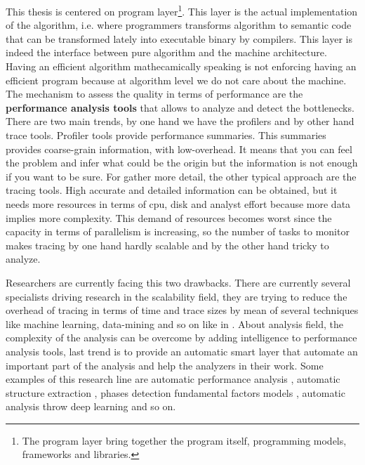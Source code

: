 \documentclass[12pt]{report}
\begin{document}
This thesis is centered on program layer\footnote{The program layer 
bring together the program itself, programming models, frameworks and libraries.}. 
This layer is the actual implementation of the algorithm, i.e. where programmers
transforms algorithm to  semantic code that can be transformed lately into
executable binary by compilers. This layer is indeed the interface between pure 
algorithm and the machine architecture. Having an efficient algorithm
mathecamically speaking is not enforcing having an efficient program 
because at algorithm level we do not care about the machine. 
The mechanism to assess the quality in terms of performance are the {\bf performance 
analysis tools} that allows to analyze and detect the bottlenecks. 
There are two main trends, by one hand we have the profilers and by other hand trace
tools. Profiler tools provide performance summaries. This summaries provides 
coarse-grain information, with low-overhead. It means that you can feel the problem 
and infer what could be the origin but the information is not enough if you want 
to be sure. For gather more detail, the other typical approach are the tracing 
tools. High accurate and detailed information can be obtained, but it needs 
more resources in terms of cpu, disk and analyst effort because more data implies 
more complexity. This demand of resources becomes worst since the capacity in 
terms of parallelism is increasing, so the number of tasks to monitor makes 
tracing by one hand hardly scalable and by the other hand tricky to analyze. 

Researchers are currently facing this two drawbacks. There are currently several
specialists driving research in the scalability field, they are trying to reduce 
the overhead of tracing in terms of time and trace sizes by mean of several 
techniques like machine learning, data-mining and so on like in 
\cite{llort2015intelligent}. About analysis field, the complexity of the analysis 
can be overcome by adding intelligence to performance analysis tools, last 
trend is to provide an automatic smart layer that automate an important part 
of the analysis and help the analyzers in their work. Some examples of this 
research line are automatic performance analysis \cite{wolf2003automatic}, 
automatic structure extraction \cite{casas2007automatic}, phases detection 
\cite{gonzalez2013application} fundamental factors models \cite{casas2008aass}, 
automatic analysis throw deep learning \cite{simon:2017:perfdp} and so on.
\end{document}
